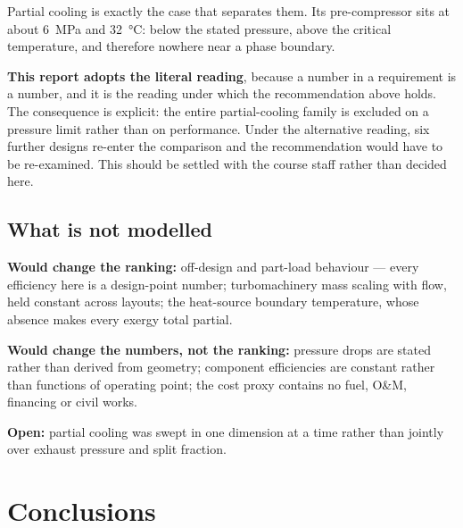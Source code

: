 Partial cooling is exactly the case that separates them. Its
pre-compressor sits at about \SI{6}{\mega\pascal} and
\SI{32}{\celsius}: below the stated pressure, above the critical
temperature, and therefore nowhere near a phase boundary.

\textbf{This report adopts the literal reading}, because a number in a
requirement is a number, and it is the reading under which the
recommendation above holds. The consequence is explicit: the entire
partial-cooling family is excluded on a pressure limit rather than on
performance. Under the alternative reading, six further designs re-enter
the comparison and the recommendation would have to be re-examined.
This should be settled with the course staff rather than decided here.

\subsection{What is not modelled}

\textbf{Would change the ranking:} off-design and part-load behaviour
--- every efficiency here is a design-point number; turbomachinery mass
scaling with flow, held constant across layouts; the heat-source
boundary temperature, whose absence makes every exergy total partial.

\textbf{Would change the numbers, not the ranking:} pressure drops are
stated rather than derived from geometry; component efficiencies are
constant rather than functions of operating point; the cost proxy
contains no fuel, O\&M, financing or civil works.

\textbf{Open:} partial cooling was swept in one dimension at a time
rather than jointly over exhaust pressure and split fraction.

\section{Conclusions}

